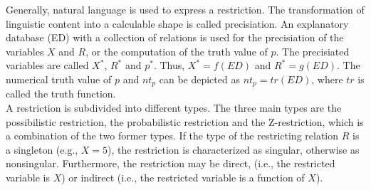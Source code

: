 \documentclass[conference]{IEEEtran}
\begin{document}
Generally, natural language is used to express a restriction. The transformation of linguistic content into a calculable shape is called precisiation. An explanatory database (ED) with a collection of relations is used for the precisiation of the variables \begin{math} X \end{math} and \begin{math} R \end{math}, or the computation of the truth value of \begin{math} p \end{math}. The precisiated variables are called \begin{math} X^{*} \end{math}, \begin{math} R^{*} \end{math} and \begin{math}p^{*} \end{math}. Thus, \begin{math} X^{*}=f(ED) \end{math} and \begin{math} R^{*}=g(ED) \end{math}. The numerical truth value of \begin{math} p \end{math} and \begin{math}nt_{p} \end{math} can be depicted as \begin{math} nt_{p}=tr(ED) \end{math}, where \begin{math} tr \end{math} is called the truth function.\\
A restriction is subdivided into different types. The three main types are the possibilistic restriction, the probabilistic restriction and the Z-restriction, which is a combination of the two former types. 
If the type of the restricting relation $R$ is a singleton (e.g., $X = 5$), the restriction is characterized as singular, otherwise as nonsingular. Furthermore, the restriction may be direct, (i.e., the restricted variable is \begin{math} X \end{math}) or indirect (i.e., the restricted variable is a function of \begin{math} X \end{math}).\\
\end{document}
